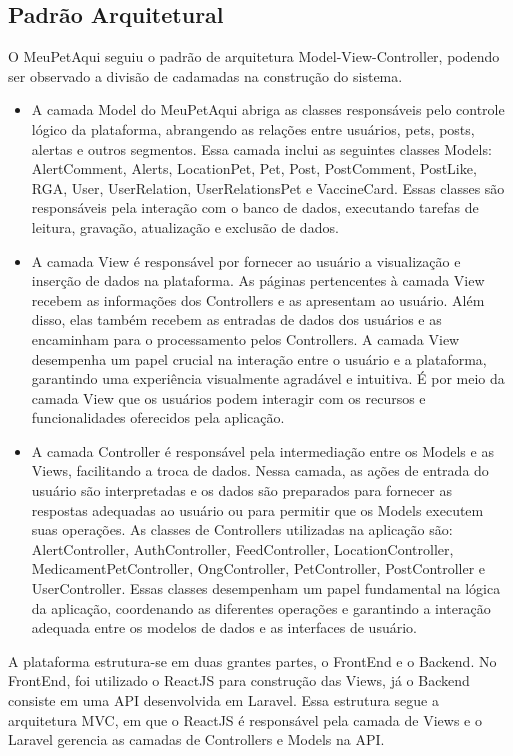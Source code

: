 \subsection{Padrão Arquitetural}
O MeuPetAqui seguiu o padrão de arquitetura Model-View-Controller, podendo ser observado a divisão de cadamadas na construção do sistema.
\begin{itemize}
   \item A camada Model do MeuPetAqui abriga as classes responsáveis pelo controle lógico da plataforma, abrangendo as relações entre usuários, pets, posts, alertas e outros segmentos. Essa camada inclui as seguintes classes Models: AlertComment, Alerts, LocationPet, Pet, Post, PostComment, PostLike, RGA, User, UserRelation, UserRelationsPet e VaccineCard. Essas classes são responsáveis pela interação com o banco de dados, executando tarefas de leitura, gravação, atualização e exclusão de dados.
    \item A camada View é responsável por fornecer ao usuário a visualização e inserção de dados na plataforma. As páginas pertencentes à camada View recebem as informações dos Controllers e as apresentam ao usuário. Além disso, elas também recebem as entradas de dados dos usuários e as encaminham para o processamento pelos Controllers. A camada View desempenha um papel crucial na interação entre o usuário e a plataforma, garantindo uma experiência visualmente agradável e intuitiva. É por meio da camada View que os usuários podem interagir com os recursos e funcionalidades oferecidos pela aplicação.
    \item A camada Controller é responsável pela intermediação entre os Models e as Views, facilitando a troca de dados. Nessa camada, as ações de entrada do usuário são interpretadas e os dados são preparados para fornecer as respostas adequadas ao usuário ou para permitir que os Models executem suas operações. As classes de Controllers utilizadas na aplicação são: AlertController, AuthController, FeedController, LocationController, MedicamentPetController, OngController, PetController, PostController e UserController. Essas classes desempenham um papel fundamental na lógica da aplicação, coordenando as diferentes operações e garantindo a interação adequada entre os modelos de dados e as interfaces de usuário.
\end{itemize}
A plataforma estrutura-se em duas grantes partes, o FrontEnd e o Backend. No FrontEnd, foi utilizado o ReactJS para construção das Views, já o Backend consiste em uma API desenvolvida em Laravel. Essa estrutura segue a arquitetura MVC, em que o ReactJS é responsável pela camada de Views e o Laravel gerencia as camadas de Controllers e Models na API. 
\newpage
